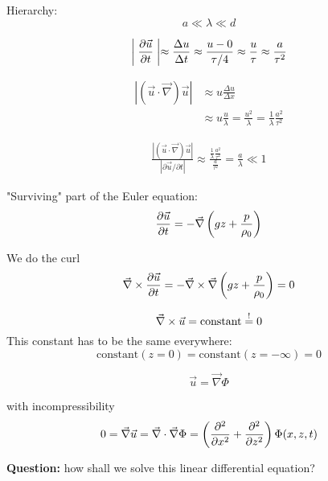 Hierarchy:
\begin{equation}
a\ll\lambda\ll d
\end{equation}

\begin{equation}
\biggm\vert\frac{\partial \vec{u}}{\partial t}\biggm\vert \approx \frac{\Delta u}{\Delta t} \approx \frac{u-0}{\tau/4} \approx \frac{u}{\tau} \approx \frac{a}{\tau^2}
\end{equation}

\begin{align}
|(\vec{u}\cdot\vec{\nabla})\vec{u}| &\approx u\frac{\Delta u}{\Delta x}\\
&\approx u\frac{u}{\lambda}=\frac{u^2}{\lambda} = \frac{1}{\lambda}\frac{a^2}{\tau^2}
\end{align}

\begin{align}
\frac{|(\vec{u}\cdot\vec{\nabla})\vec{u}|}{|\partial \vec{u}/\partial t|} \approx \frac{\frac{1}{\lambda}\frac{a^2}{\tau^2}}{\frac{a}{\tau^2}} = \frac{a}{\lambda} \ll 1
\end{align}

"Surviving" part of the Euler equation:
\begin{equation}
\frac{\partial \vec{u}}{\partial t}=-\vec{\nabla}\left(gz+\frac{p}{\rho_0}\right)
\end{equation}

We do the curl
\begin{equation}
\vec{\nabla}\times\frac{\partial \vec{u}}{\partial t}=-\vec{\nabla}\times\vec{\nabla}\left(gz+\frac{p}{\rho_0}\right) = 0
\end{equation}

\begin{equation}
\vec{\nabla}\times\vec{u}=\mathrm{constant}\overset{!}{=}0
\end{equation}
This constant has to be the same everywhere:
\begin{equation}
\mathrm{constant}(z=0) = \mathrm{constant}(z=-\infty)=0
\end{equation}

\begin{equation}
\vec{u}=\vec{\nabla}\Phi
\end{equation}

with incompressibility
\begin{equation}
0=\vec{\nabla}\vec{u}=\vec{\nabla}\cdot\vec{\nabla}\Phi=\left(\frac{\partial^2 }{\partial x^2}+\frac{\partial^2 }{\partial z^2}\right)\Phi(x,z,t)
\end{equation}

\textbf{Question:} how shall we solve this linear differential equation?


